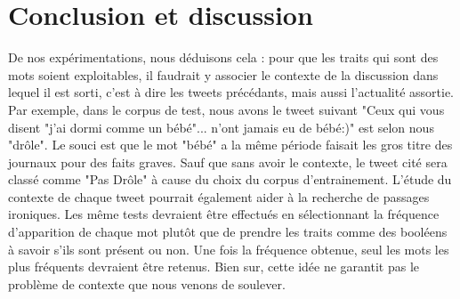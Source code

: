 \documentclass[10pt,a4paper,twoside]{article}
\begin{document}
%



\section{Conclusion et discussion}

De nos expérimentations, nous déduisons cela : pour que les traits qui sont des mots soient exploitables, il faudrait y associer le contexte de la discussion dans lequel il est sorti, c'est à dire les tweets précédants, mais aussi l'actualité assortie. Par exemple, dans le corpus de test, nous avons le tweet suivant "Ceux qui vous disent "j'ai dormi comme un bébé"... n'ont jamais eu de bébé:)" est selon nous "drôle". Le souci est que le mot "bébé" a la même période faisait les gros titre des journaux pour des faits graves. Sauf que sans avoir le contexte, le tweet cité sera classé comme "Pas Drôle" à cause du choix du corpus d'entrainement. L'étude du contexte de chaque tweet pourrait également aider à la recherche de passages ironiques. 
Les même tests devraient être effectués en sélectionnant la fréquence d'apparition de chaque mot plutôt que de prendre les traits comme des booléens à savoir s'ils sont présent ou non. Une fois la fréquence obtenue, seul les mots les plus fréquents devraient être retenus. Bien sur, cette idée ne garantit pas le problème de contexte que nous venons de soulever.
\end{document}
